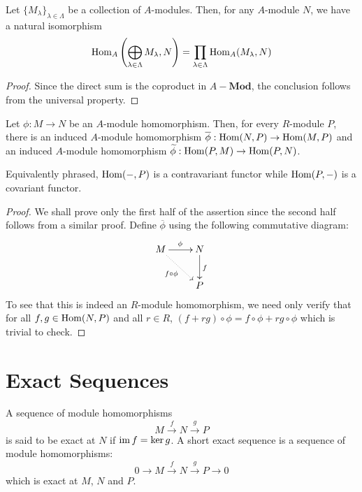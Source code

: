 \begin{proposition}
    Let $\{M_\lambda\}_{\lambda\in\Lambda}$ be a collection of $A$-modules. Then, for any $A$-module $N$, we have a natural isomorphism
    \begin{equation*}
        \operatorname{Hom}_A\left(\bigoplus_{\lambda\in\Lambda}M_\lambda, N\right) = \prod_{\lambda\in\Lambda}\operatorname{Hom}_A(M_\lambda,N)
    \end{equation*}
\end{proposition}
\begin{proof}
    Since the direct sum is the coproduct in $A-\mathbf{Mod}$, the conclusion follows from the universal property.
\end{proof}

\begin{theorem}
    Let $\phi: M\to N$ be an $A$-module homomorphism. Then, for every $R$-module $P$, there is an induced $A$-module homomorphism $\overline\phi:\operatorname{Hom}(N,P)\to\operatorname{Hom}(M,P)$ and an induced $A$-module homomorphism $\widetilde\phi:\operatorname{Hom}(P,M)\to\operatorname{Hom}(P,N)$. 
    
    Equivalently phrased, $\operatorname{Hom}(-,P)$ is a contravariant functor while $\operatorname{Hom}(P,-)$ is a covariant functor.
\end{theorem}
\begin{proof}
    We shall prove only the first half of the assertion since the second half follows from a similar proof. Define $\overline\phi$ using the following commutative diagram: 
    \begin{equation*}
    \xymatrix {
        M\ar[r]^{\phi}\ar@{.>}[rd]_{f\circ\phi} & N\ar[d]^f\\
        & P
    }
    \end{equation*}
    To see that this is indeed an $R$-module homomorphism, we need only verify that for all $f,g\in\operatorname{Hom}(N,P)$ and all $r\in R$, $(f + rg)\circ\phi = f\circ\phi + rg\circ\phi$ which is trivial to check.
\end{proof}

\section{Exact Sequences}

\begin{definition}
    A sequence of module homomorphisms 
    \begin{equation*}
        M\stackrel{f}{\longrightarrow} N\stackrel{g}{\longrightarrow}P
    \end{equation*}
    is said to be exact at $N$ if $\operatorname{im} f = \ker g$. A short exact sequence is a sequence of module homomorphisms: 
    \begin{equation*}
        0\longrightarrow M\stackrel{f}{\longrightarrow} N\stackrel{g}{\longrightarrow} P\longrightarrow 0
    \end{equation*}
    which is exact at $M$, $N$ and $P$.
\end{definition}

